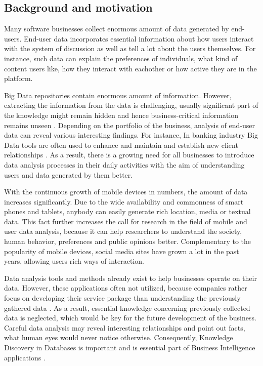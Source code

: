 \subsection{Background and motivation}
	Many software businesses collect enormous amount of data generated by end-users. End-user data incorporates essential information about how users interact with the system of discussion as well as tell a lot about the users themselves. For instance, such data can explain the preferences of individuals, what kind of content users like, how they interact with eachother or how active they are in the platform.
    
    Big Data repositories contain enormous amount of information. However, extracting the information from the data is challenging, usually significant part of the knowledge might remain hidden and hence business-critical information remains unseen \cite{inmon2007tapping, wegener2010integrating, introtodatamining, chinesemobilebankingusers}. Depending on the portfolio of the business, analysis of end-user data can reveal various interesting findings. For instance, In banking industry Big Data tools are often used to enhance and maintain and establish new client relationships \cite{chinesemobilebankingusers, bigdatamanagementrevolution}. As a result, there is a growing need for all businesses to introduce data analysis processes in their daily activities with the aim of understanding users and data generated by them better.
    
    With the continuous growth of mobile devices in numbers, the amount of data increases significantly. Due to the wide availability and commonness of smart phones and tablets, anybody can easily generate rich location, media or textual data. This fact further increases the call for research in the field of mobile and user data analysis, because it can help researchers to understand the society, human behavior, preferences and public opinions better. Complementary to the popularity of mobile devices, social media sites have grown a lot in the past years, allowing users rich ways of interaction.  

    Data analysis tools and methods already exist to help businesses operate on their data. However, these applications often not utilized, because companies rather focus on developing their service package than understanding the previously gathered data \cite{inmon2007tapping}. As a result, essential knowledge concerning previously collected data is neglected, which would be key for the future development of the business. Careful data analysis may reveal interesting relationships and point out facts, what human eyes would never notice otherwise. Consequently, Knowledge Discovery in Databases is important and is essential part of Business Intelligence applications \cite{zarsky2002mine}. 
    
